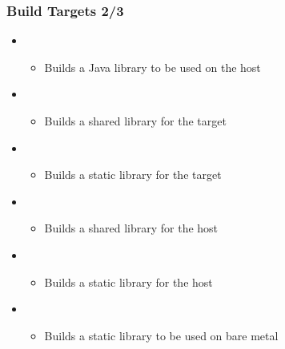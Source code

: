 \begin{frame}
  \frametitle{Build Targets 2/3}
  \begin{itemize}
  \item {}
    \begin{itemize}
    \item Builds a Java library to be used on the host
    \end{itemize}
  \item {}
    \begin{itemize}
    \item Builds a shared library for the target
    \end{itemize}
  \item {}
    \begin{itemize}
    \item Builds a static library for the target
    \end{itemize}
  \item {}
    \begin{itemize}
    \item Builds a shared library for the host
    \end{itemize}
  \item {}
    \begin{itemize}
    \item Builds a static library for the host
    \end{itemize}
  \item {}
    \begin{itemize}
    \item Builds a static library to be used on bare metal
    \end{itemize}
  \end{itemize}
\end{frame}

